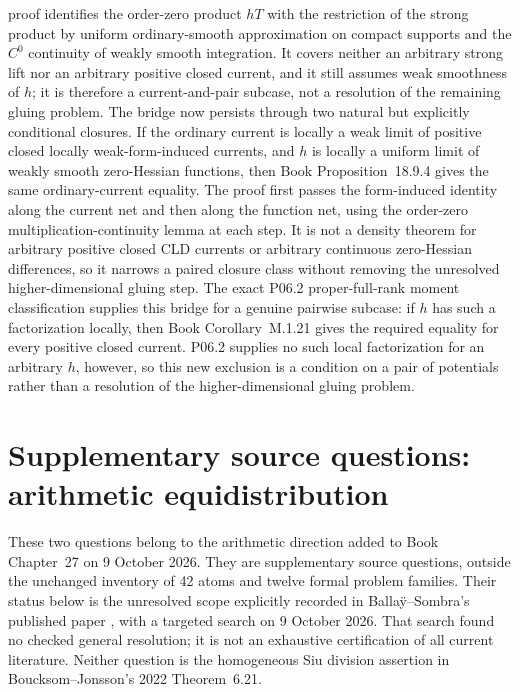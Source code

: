 \documentclass[11pt,a4paper]{article}
\theoremstyle{definition}
\theoremstyle{remark}
\begin{document}
proof identifies the order-zero product \(hT\) with the restriction of the
strong product by uniform ordinary-smooth approximation on compact supports
and the \(C^0\) continuity of weakly smooth integration.  It covers neither an
arbitrary strong lift nor an arbitrary positive closed current, and it still
assumes weak smoothness of \(h\); it is therefore a current-and-pair subcase,
not a resolution of the remaining gluing problem.
The bridge now persists through two natural but explicitly conditional
closures.  If the ordinary current is locally a weak limit of positive closed
locally weak-form-induced currents, and \(h\) is locally a uniform limit of
weakly smooth zero-Hessian functions, then
Book Proposition~18.9.4 gives the same ordinary-current
equality.  The proof first passes the form-induced identity along the current
net and then along the function net, using the order-zero
multiplication-continuity lemma at each step.  It is not a density theorem
for arbitrary positive closed CLD currents or arbitrary continuous
zero-Hessian differences, so it narrows a paired closure class without
removing the unresolved higher-dimensional gluing step.
The exact P06.2
proper-full-rank moment classification supplies this bridge for a genuine
pairwise subcase: if \(h\) has such a factorization locally, then
Book Corollary~M.1.21 gives the required equality
for every positive closed current.  P06.2 supplies no such local
factorization for an arbitrary \(h\), however, so this new exclusion is a
condition on a pair of potentials rather than a resolution of the
higher-dimensional gluing problem.

\clearpage
\section*{Supplementary source questions: arithmetic equidistribution}
\label{supp:arithmetic-equidistribution}
These two questions belong to the arithmetic direction added to Book
Chapter~27 on 9 October 2026. They are supplementary source questions,
outside the unchanged inventory of 42 atoms and twelve formal problem
families. Their status below is the unresolved scope explicitly recorded
in Balla\"y--Sombra's published paper \cite{BallaySombra26Published},
with a targeted search on 9 October 2026. That search found no checked
general resolution; it is not an exhaustive certification of all current
literature. Neither question is the homogeneous Siu division assertion
in Boucksom--Jonsson's 2022 Theorem~6.21.
\end{document}
